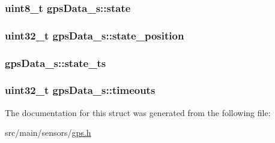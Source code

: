 \hypertarget{structgpsData__s_a0c6e93c90d6f278d6df12ab56b0c77ba}{
\subsubsection[{state}]{\setlength{\rightskip}{0pt plus 5cm}uint8\+\_\+t gps\+Data\+\_\+s\+::state}}\label{structgpsData__s_a0c6e93c90d6f278d6df12ab56b0c77ba}
\hypertarget{structgpsData__s_a2fc182c3d302ef43771ff6d2b7c5d104}{
\subsubsection[{state\+\_\+position}]{\setlength{\rightskip}{0pt plus 5cm}uint32\+\_\+t gps\+Data\+\_\+s\+::state\+\_\+position}}\label{structgpsData__s_a2fc182c3d302ef43771ff6d2b7c5d104}
\hypertarget{structgpsData__s_a607e8e85fe017ebd8ed6280e90812b9f}{
\subsubsection[{state\+\_\+ts}]{ gps\+Data\+\_\+s\+::state\+\_\+ts}}\label{structgpsData__s_a607e8e85fe017ebd8ed6280e90812b9f}
\hypertarget{structgpsData__s_a88b130e1b54e7aa9c5df68d6815a2def}{
\subsubsection[{timeouts}]{\setlength{\rightskip}{0pt plus 5cm}uint32\+\_\+t gps\+Data\+\_\+s\+::timeouts}}\label{structgpsData__s_a88b130e1b54e7aa9c5df68d6815a2def}


The documentation for this struct was generated from the following file\+:\begin{DoxyCompactItemize}
\item 
src/main/sensors/\hyperlink{sensors_2gps_8h}{gps.\+h}\end{DoxyCompactItemize}
